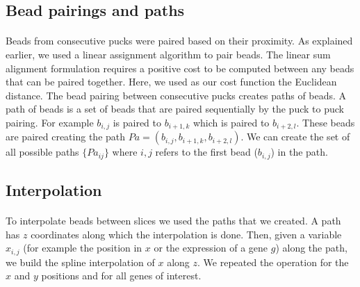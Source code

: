 \documentclass[10pt,a4paper]{article}
\begin{document}
\subsection{Bead pairings and paths}
\paragraph{}Beads from consecutive pucks were paired based on their proximity.
As explained earlier, we used a linear assignment algorithm to pair beads.
The linear sum alignment formulation requires a positive cost to be computed between any beads that can be paired together.
Here, we used as our cost function the Euclidean distance.
The bead pairing between consecutive pucks creates paths of beads. A path of beads is a set of beads that are paired sequentially by the puck to puck pairing. For example \(b_{i,j}\) is paired to \(b_{i+1,k}\) which is paired to \(b_{i+2,l}\). These beads are paired creating the path \(Pa=(b_{i,j}, b_{i+1,k},b_{i+2,l})\). We can create the set of all possible paths \(\{Pa_{ij}\}\) where \(i,j\) refers to the first bead (\(b_{i,j}\)) in the path.
\subsection{Interpolation}
\paragraph{}To interpolate beads between slices we used the paths that we created. A path has \(z\) coordinates along which the interpolation is done. Then, given a variable \(x_{i,j}\) (for example the position in \(x\) or the expression of a gene \(g\)) along the path, we build the spline interpolation of \(x\) along \(z\). We repeated the operation for the \(x\) and \(y\) positions and for all genes of interest.
\end{document}
